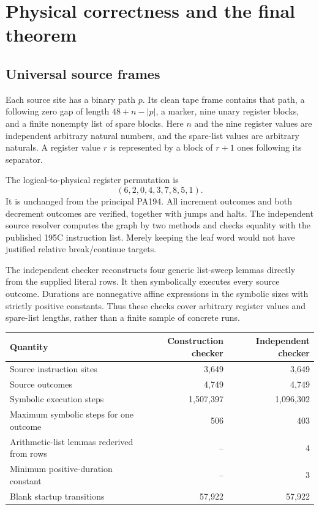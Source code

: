 \documentclass[11pt]{article}
\begin{document}
\section{Physical correctness and the final theorem}\label{sec:physical}

\subsection{Universal source frames}

Each source site has a binary path $p$. Its clean tape frame contains that
path, a following zero gap of length $48+n-|p|$, a marker, nine unary
register blocks, and a finite nonempty list of spare blocks. Here $n$ and
the nine register values are independent arbitrary natural numbers, and
the spare-list values are arbitrary naturals. A register value $r$ is
represented by a block of $r+1$ ones following its separator.

The logical-to-physical register permutation is
\[
(6,2,0,4,3,7,8,5,1).
\]
It is unchanged from the principal PA194. All increment outcomes and
both decrement outcomes are verified, together with jumps and halts.
The independent source resolver computes the graph by two methods and
checks equality with the published 195C instruction list. Merely keeping
the leaf word would not have justified relative break/continue targets.

The independent checker reconstructs four generic list-sweep lemmas
directly from the supplied literal rows. It then symbolically executes
every source outcome. Durations are nonnegative affine expressions in
the symbolic sizes with strictly positive constants. Thus these checks
cover arbitrary register values and spare-list lengths, rather than a
finite sample of concrete runs.

\begin{center}
\begin{tabular}{@{}lrr@{}}
\toprule
Quantity&Construction checker&Independent checker\\
\midrule
Source instruction sites&3,649&3,649\\
Source outcomes&4,749&4,749\\
Symbolic execution steps&1,507,397&1,096,302\\
Maximum symbolic steps for one outcome&506&403\\
Arithmetic-list lemmas rederived from rows&--&4\\
Minimum positive-duration constant&--&3\\
Blank startup transitions&57,922&57,922\\
\bottomrule
\end{tabular}
\end{center}
\end{document}
